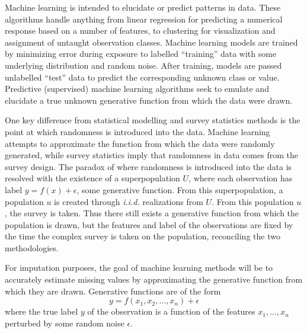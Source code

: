 \documentclass[12pt,twoside]{reedthesis}
\begin{document}
Machine learning is intended to elucidate or predict patterns in data.
These algorithms handle anything from linear regression for predicting a
numerical response based on a number of features, to clustering for
visualization and assignment of untaught observation classes. Machine
learning models are trained by minimizing error during exposure to
labelled ``training'' data with some underlying distribution and random
noise. After training, models are passed unlabelled ``test'' data to
predict the corresponding unknown class or value. Predictive
(supervised) machine learning algorithms seek to emulate and elucidate a
true unknown generative function from which the data were drawn.

One key difference from statistical modelling and survey statistics
methods is the point at which randomness is introduced into the data.
Machine learning attempts to approximate the function from which the
data were randomly generated, while survey statistics imply that
randomness in data comes from the survey design. The paradox of where
randomness is introduced into the data is resolved with the existence of
a superpopulation \(U\), where each observation has label
\(y = f(x) + \epsilon\), some generative function. From this
superpopulation, a population \(u\) is created through \emph{i.i.d.}
realizations from \(U\). From this population \(u\), the survey is
taken. Thus there still exists a generative function from which the
population is drawn, but the features and label of the observations are
fixed by the time the complex survey is taken on the population,
reconciling the two methodologies.

For imputation purposes, the goal of machine learning methods will be to
accurately estimate missing values by approximating the generative
function from which they are drawn. Generative functions are of the form
\[
y = f(x_1, x_2, \dots, x_n) + \epsilon
\] where the true label \(y\) of the observation is a function of the
features \(x_1, ..., x_n\) perturbed by some random noise \(\epsilon\).
\end{document}
